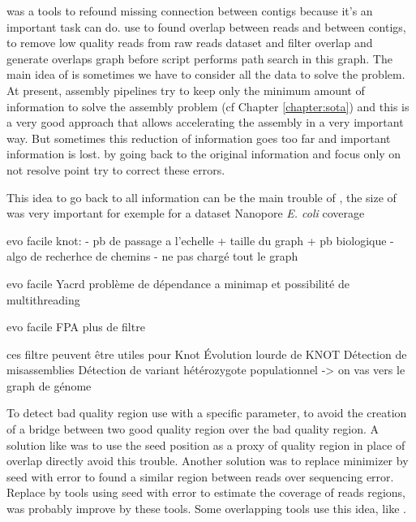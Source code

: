 \documentclass[main.tex]{subfiles}
\begin{document}
\knot was a tools to refound missing connection between contigs because it's an important task \knot can do. \knot use \minimap to found overlap between reads and between contigs, \yacrd to remove low quality reads from raw reads dataset and \fpa filter overlap and generate overlaps graph before \knot script performs path search in this graph. The main idea of \knot is sometimes we have to consider all the data to solve the problem. At present, assembly pipelines try to keep only the minimum amount of information to solve the assembly problem (cf Chapter \ref{chapter:sota}) and this is a very good approach that allows accelerating the assembly in a very important way. But sometimes this reduction of information goes too far and important information is lost. \knot by going back to the original information and focus only on not resolve point try to correct these errors.

This idea to go back to all information can be the main trouble of \knot, the size of \knot \OLC was very important for exemple for a dataset Nanopore \textit{E. coli} coverage 


evo facile knot:
- pb de passage a l'echelle
    + taille du graph
    + pb biologique
- algo de recherhce de chemins
- ne pas chargé tout le graph

evo facile Yacrd problème de dépendance a minimap et possibilité de multithreading

evo facile FPA plus de filtre 

ces filtre peuvent être utiles pour Knot
Évolution lourde de KNOT
Détection de misassemblies
Détection de variant hétérozygote populationnel
-> on vas vers le graph de génome








\bigskip


\bigskip



To detect bad quality region \yacrd use \minimap with a specific parameter, to avoid the creation of a bridge between two good quality region over the bad quality region. A solution like \miniscrub was to use the seed position as a proxy of quality region in place of overlap directly avoid this trouble. Another solution was to replace minimizer by seed with error to found a similar region between reads over sequencing error. Replace \minimap by tools using seed with error to estimate the coverage of reads regions, was probably improve by these tools. Some overlapping tools use this idea, like \cite{GroupK}.
\end{document}
